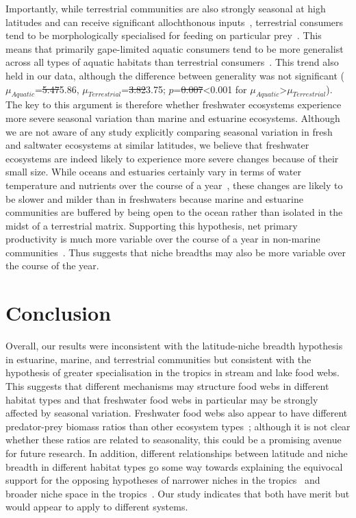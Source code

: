\documentclass[12pt]{article}
\begin{document}
  Importantly, while terrestrial communities are also strongly seasonal at
  high latitudes and can receive significant allochthonous
  inputs~\cite{Nakano2001}, terrestrial consumers tend to be
  morphologically specialised for feeding on particular prey~\cite{Liem1990}.
  This means that primarily gape-limited aquatic consumers tend to be more
  generalist across all types of aquatic habitats than terrestrial 
  consumers~\cite{Liem1990,Shurin2006}. This trend also held in our data, although the difference between generality was not significant (
  $\mu_{Aquatic}$=\st{5.47}5.86, $\mu_{Terrestrial}$=\st{3.82}3.75; $p$=\st{0.007}\textless0.001 for $\mu_{Aquatic}$\textgreater$\mu_{Terrestrial}$). 
  The key to this argument is therefore whether freshwater ecosystems experience
  more severe seasonal variation than marine and estuarine ecosystems. Although
  we are not aware of any study explicitly comparing seasonal variation in
  fresh and saltwater ecosystems at similar latitudes, we believe that freshwater 
  ecosystems are indeed likely to experience more severe changes because of their small size.
  While oceans and estuaries certainly vary in terms of water temperature and
  nutrients over the course of a year~\cite{Baird1989}, these changes are likely to be slower
  and milder than in freshwaters because marine and estuarine communities are buffered 
  by being open to the ocean rather than isolated in the midst of a terrestrial matrix. 
  Supporting this hypothesis, net primary productivity is much more variable over the course of a year 
  in non-marine communities~\cite{Field1998}. Thus suggests that niche breadths may also be 
  more variable over the course of the year. 


\section*{Conclusion}

  Overall, our results were inconsistent with the latitude-niche breadth
  hypothesis in estuarine, marine, and terrestrial communities but consistent
  with the hypothesis of greater specialisation in the tropics in stream and
  lake food webs. This suggests that different mechanisms may structure food
  webs in different habitat types and that freshwater food webs in particular
  may be strongly affected by seasonal variation. Freshwater food webs also
  appear to have different predator-prey biomass ratios than other ecosystem
  types~\cite{Riede2011}; although it is not clear whether these ratios are related
  to seasonality, this could be a promising avenue for future research. In addition, different
  relationships between latitude and niche breadth in different habitat types
  go some way towards explaining the equivocal support for the opposing
  hypotheses of narrower niches in the tropics~\cite{Vazquez2004} and broader
  niche space in the tropics~\cite{Davies2007}. Our study indicates that both 
  have merit but would appear to apply to different systems.
\end{document}
